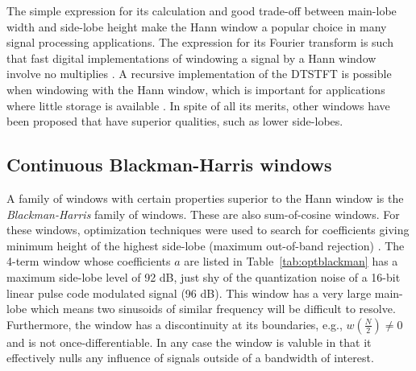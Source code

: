 The simple expression for its calculation and good trade-off between main-lobe
width and side-lobe height make the Hann window a popular choice in many signal
processing applications. The expression for its Fourier transform is such that
fast digital implementations of windowing a signal by a Hann window involve no
multiplies \cite[p.~183]{harris1978use}. A recursive implementation of the
DTSTFT is possible when windowing with the Hann window, which is important for
applications where little storage is available \cite[p.~102]{stankovic2014time}.
In spite of all its merits, other windows have been proposed that have superior
qualities, such as lower side-lobes.

\subsection{Continuous Blackman-Harris windows}

A family of windows with certain properties superior to the Hann window is the
\textit{Blackman-Harris} family of windows. These are also sum-of-cosine
windows. For these windows, optimization techniques were used to search for
coefficients giving minimum height of the highest side-lobe (maximum out-of-band
rejection) \cite{rabiner1970approach}. The 4-term window whose coefficients $a$
are listed in Table~\ref{tab:optblackman} has a maximum side-lobe level of 92
dB, just shy of the quantization noise of a 16-bit linear pulse code modulated
signal (96 dB). This window has a very large main-lobe which means two sinusoids of
similar frequency will be difficult to resolve. Furthermore, the window has a
discontinuity at its boundaries, e.g., $w \left( \frac{N}{2} \right) \neq 0$ and
is not once-differentiable. In any case the window is valuble in that it
effectively nulls any influence of signals outside of a bandwidth of interest.

